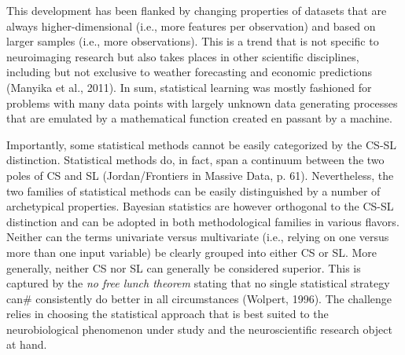\documentclass[authoryear,review,3p]{elsarticle}
\begin{document}
This development has been flanked by changing properties of datasets that
are always higher-dimensional (i.e., more features per observation)
and
based
on larger samples (i.e., more observations).
This is a trend that is not specific to
neuroimaging research but also takes places
in other scientific disciplines,
including but not exclusive to weather forecasting and economic predictions
(Manyika et al., 2011).
In sum,
statistical learning was mostly fashioned
for problems with many data points with largely unknown
data generating processes
that are emulated by a mathematical function
created en passant by a machine.


Importantly, some statistical
methods cannot be easily categorized by the CS-SL distinction.
Statistical methods do, in fact, span a continuum between the two poles of CS and SL
(Jordan/Frontiers in Massive Data, p. 61).
Nevertheless, the two families of statistical methods
can be easily distinguished by a number of archetypical properties.
Bayesian statistics are however orthogonal to the CS-SL distinction
and can be adopted in both methodological families in various flavors.
%
Neither can the terms univariate versus multivariate
(i.e., relying on one versus more than one input variable)
be clearly grouped into either CS or SL.
%
More generally,
neither CS nor SL can generally be considered superior.
This is captured by the \textit{no free lunch theorem}
stating that no single statistical strategy can#
consistently do better in all circumstances (Wolpert, 1996).
The challenge relies in choosing
the statistical approach that is best suited
to the neurobiological phenomenon under study and the neuroscientific research object at hand.
\end{document}
